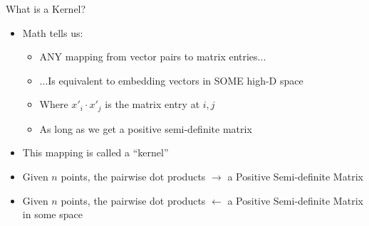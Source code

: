 \documentclass[aspectratio=169]{beamer}
\begin{document}
\begin{frame}{What is a Kernel?}

\begin{itemize}
\item Math tells us:
	\begin{itemize}
	\item ANY mapping from vector pairs to matrix entries...
	\item ...Is equivalent to embedding vectors in SOME high-D space
	\item Where $x'_i \cdot x'_j$ is the matrix entry at $i,j$
	\item As long as we get a  positive semi-definite matrix
	\end{itemize}
\item This mapping is called a ``kernel''
\vspace{1em}
\item Given $n$ points, the pairwise dot products $\rightarrow$ a Positive Semi-definite Matrix
\item Given $n$ points, the pairwise dot products $\leftarrow$ a Positive Semi-definite Matrix \\
in some space

\end{itemize}
\end{frame}
\end{document}
